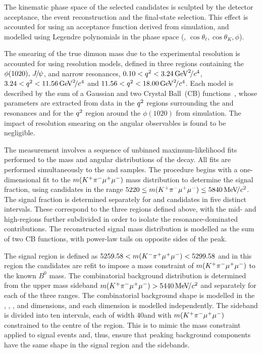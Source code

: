 The kinematic phase space of the selected candidates is sculpted by the detector acceptance, the event reconstruction and the final-state selection. This effect is accounted for using an acceptance function derived from simulation, and modelled using Legendre polynomials in the phase space (\qsq, $\cos{\theta_\ell}, \cos{\theta_K}, \phi$).

The smearing of the true dimuon mass due to the experimental resolution is accounted for using resolution models, defined in three \qsq regions containing the $\phi(1020), \, {{J\mskip -3mu/\mskip -2mu\psi}}$, and \psitwos narrow resonances, $0.10 < {q^2} < 3.24 \text{\,Ge\kern -0.1em V}^2\!/c^4$, $3.24 < {q^2} < 11.56 \text{\,Ge\kern -0.1em V}^2\!/c^4$ and $11.56 < {q^2} < 18.00 \text{\,Ge\kern -0.1em V}^2\!/c^4$.
Each model is described by the sum of a Gaussian and two Crystal Ball~(CB) functions~\cite{Skwarnicki:1986xj}, whose parameters are extracted from data in the ${q^2}$ regions surrounding the \jpsi and \psitwos resonances and for the ${q^2}$ region around the $\phi(1020)$ from simulation. The impact of resolution smearing on the angular observables is found to be negligible.

The measurement involves a sequence of unbinned maximum-likelihood fits performed to the mass and angular distributions of the \BdbToKstbMuMu decay. All fits are performed simultaneously to the \Bz and \Bzb samples. The procedure begins with a one-dimensional fit to the $m({{K}^+}{{\pi}^-}{\mu^+\mu^-})$ mass distribution to determine the signal fraction,  using candidates in the range $5220 \leq m({{K}^+}{{\pi}^-}{\mu^+\mu^-}) \leq 5840 \text{\,Me\kern -0.1em V\!/}c^2$. The signal fraction is determined separately for \Bz and \Bzb candidates in five distinct \qsq intervals. These correspond to the three \qsq regions defined above, with the mid- and high-\qsq regions further subdivided in order to isolate the resonance-dominated contributions. The reconstructed signal mass distribution is modelled as the sum of two CB functions, with power-law tails on opposite sides of the peak.

The signal region is defined as $5259.58 < m({{K}^-}{{\pi}^+}{\mu^+\mu^-}) < 5299.58$ \mevcc and in this region the candidates are refit to impose a mass constraint of $m({{K}^+}{{\pi}^-}{\mu^+\mu^-})$ to the known $B^0$ mass.
The combinatorial background distribution is determined from the upper mass sideband $m({{K}^+}{{\pi}^-}{\mu^+\mu^-}) > 5440 \text{\,Me\kern -0.1em V\!/}c^2$ and separately for each of the three \qsq ranges. The combinatorial background shape is modelled in the \ctl, \ctk, \phih, and \qsq dimensions, and each dimension is modelled independently. The sideband is divided into ten intervals, each of width 40\mevcc and with $m({{K}^+}{{\pi}^-}{\mu^+\mu^-})$ constrained to the centre of the region. This is to mimic the mass constraint applied to signal events and, thus, ensure that peaking background components have the same shape in the signal region and the sidebands.

